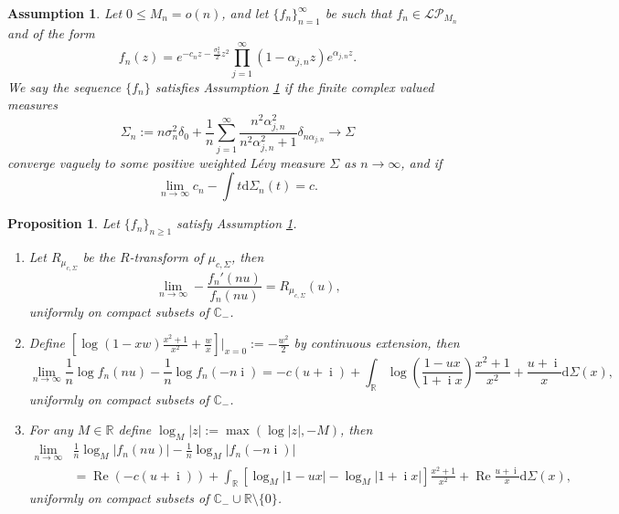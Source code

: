 \documentclass[10pt,a4paper]{amsart}
\newtheorem{assumption}{Assumption}
\newtheorem{proposition}{Proposition}
\newcommand{\C}{\mathbb{C}}
\newcommand{\LP}{\mathcal{LP}}
\newcommand{\R}{\mathbb{R}}
\renewcommand\Re{\operatorname{Re}}
\newcommand{\dd}{\mathrm{d}}
\DeclareMathOperator{\ii}{i}
\begin{document}
\begin{assumption} \label{assump:main assumption}
	Let $0\leq M_n=o(n)$, and let $\{f_{n}\}_{n=1}^{\infty}$ be such that $f_n\in \LP_{M_n}$ and of the form \begin{equation}
		f_n(z)=e^{-c_{n}z-\frac{\sigma_{n}^2}{2}z^2}\prod_{j=1}^{\infty}\left(1-\alpha_{j,n}z\right)e^{\alpha_{j,n}z}.
	\end{equation} 
	We say the sequence $\{f_n\}$ satisfies Assumption \ref{assump:main assumption} if the finite complex valued measures
	\begin{equation}\label{eq:Sigma_n assumptions}
		\Sigma_{n}:=n\sigma_{n}^2\delta_{0}+\frac{1}{n}\sum_{j=1}^{\infty}\frac{n^2\alpha_{j,n}^2}{n^2\alpha_{j,n}^2+1}\delta_{n\alpha_{j,n}} \to \Sigma
	\end{equation}
	converge vaguely to some positive weighted L\'evy measure $\Sigma$ as $n\to\infty$, and if 
	\begin{equation}\label{eq:c assumptions} \lim\limits_{n\rightarrow\infty}c_{n}-\int t\dd\Sigma_{n}(t)=c.\end{equation} %
	\end{assumption}

 \begin{proposition}\label{prop:convergence of R-transforms}
	Let $\{f_{n}\}_{n\geq 1}$ satisfy Assumption \ref{assump:main assumption}. 
	\begin{enumerate}
		\item Let $R_{\mu_{c,\Sigma}}$ be the $R$-transform of $\mu_{c,\Sigma}$, then 
		\begin{equation}
			\lim\limits_{n\rightarrow\infty}-\frac{f_{n}'(nu)}{f_{n}(nu)}= R_{\mu_{c,\Sigma}}(u),
		\end{equation} 
		uniformly on compact subsets of $\C_{-}$.
		
		\item Define $\left[ \log(1-xw)\frac{x^2+1}{x^2}+\frac{w}{x}\right]\Big|_{x=0}:=-\frac{w^2}{2}$ by continuous extension, then		
		\begin{equation}\label{eq:log of f_n convergence}
			\lim\limits_{n\rightarrow\infty}\frac{1}{n}\log f_{n}(nu)-\frac{1}{n}\log f_{n}(-n\ii)=-c(u+\ii)+\int_{\R}\log\left(\frac{1-ux}{1+\ii x}\right)\frac{x^2+1}{x^2}+\frac{u+\ii}{x}\dd\Sigma(x),
		\end{equation}  uniformly on compact subsets of $\C_{-}$.
		\item For any $M\in\R$ define $\log_{M}|z|:=\max(\log|z|,-M)$, then \begin{align}\label{eq:cutoff log of f_n convergence}
			\lim\limits_{n\rightarrow\infty} &\frac{1}{n}\log_{M}| f_{n}(nu)|-\frac{1}{n}\log_{M}| f_{n}(-n\ii)|\\
			&=\Re\left(-c(u+\ii)\right)+\int_{\R}\left[\log_{M}\left|{1-ux}\right|-\log_{M}\left|{1+\ii x}\right|\right]\frac{x^2+1}{x^2} +\Re\frac{u+\ii}{x}\dd\Sigma(x),\nonumber
		\end{align} uniformly on compact subsets of $\C_{-}\cup\R\setminus\{0\}$.
	\end{enumerate} 
\end{proposition} 
\end{document}
